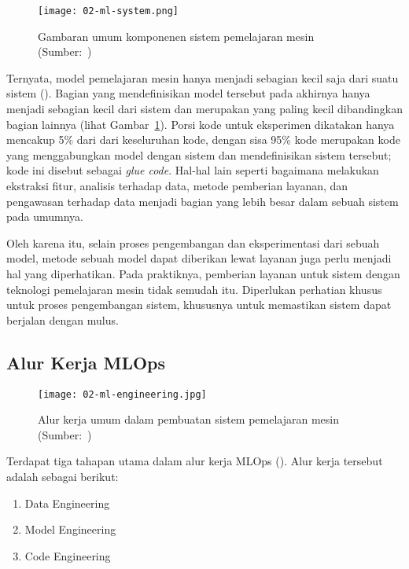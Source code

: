 \begin{figure}[ht]
  \vspace{\baselineskip}
  \centering
  \texttt{[image: 02-ml-system.png]}
  \captionsetup{justification=centering}
  \caption{Gambaran umum komponenen sistem pemelajaran mesin (Sumber:~\cite{NIPS2015_86df7dcf})}\label{fig:ml-system}
\end{figure}

Ternyata, model pemelajaran mesin hanya menjadi sebagian kecil saja dari suatu sistem (\cite{NIPS2015_86df7dcf}).
Bagian yang mendefinisikan model tersebut pada akhirnya hanya menjadi sebagian kecil dari sistem dan merupakan yang paling kecil dibandingkan bagian lainnya (lihat Gambar~\ref{fig:ml-system}).
Porsi kode untuk eksperimen dikatakan hanya mencakup 5\% dari dari keseluruhan kode, dengan sisa 95\% kode merupakan kode yang menggabungkan model dengan sistem dan mendefinisikan sistem tersebut; kode ini disebut sebagai \textit{glue code}.
Hal-hal lain seperti bagaimana melakukan ekstraksi fitur, analisis terhadap data, metode pemberian layanan, dan pengawasan terhadap data menjadi bagian yang lebih besar dalam sebuah sistem pada umumnya.

Oleh karena itu, selain proses pengembangan dan eksperimentasi dari sebuah model, metode sebuah model dapat diberikan lewat layanan juga perlu menjadi hal yang diperhatikan.
Pada praktiknya, pemberian layanan untuk sistem dengan teknologi pemelajaran mesin tidak semudah itu.
Diperlukan perhatian khusus untuk proses pengembangan sistem, khususnya untuk memastikan sistem dapat berjalan dengan mulus.

\subsection{Alur Kerja MLOps}

\begin{figure}[ht]
  \vspace{\baselineskip}
  \centering
  \texttt{[image: 02-ml-engineering.jpg]}
  \captionsetup{justification=centering}
  \caption{Alur kerja umum dalam pembuatan sistem pemelajaran mesin (Sumber:~\cite{mlopsorg})}
\end{figure}

Terdapat tiga tahapan utama dalam alur kerja MLOps (\cite{mlopsorg}).
Alur kerja tersebut adalah sebagai berikut:
\begin{enumerate}
  \item Data Engineering
  \item Model Engineering
  \item Code Engineering
\end{enumerate}

